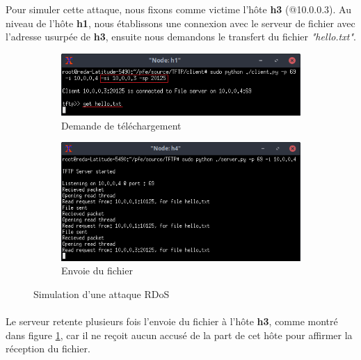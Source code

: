 \noindent Pour simuler cette attaque, nous fixons comme victime l'hôte \textbf{h3} (@10.0.0.3). Au niveau de l'hôte \textbf{h1}, nous établissons une connexion avec le serveur de fichier avec l'adresse usurpée de \textbf{h3}, ensuite nous demandons le transfert du fichier \textit{"hello.txt"}.\\
\begin{figure}[h]
\centering
\begin{subfigure}{13cm}
\centering
\includegraphics[width=\textwidth]{Figures/simulation/mininet/TFTP/client/attack}
\caption{Demande de téléchargement}
\end{subfigure}
\vskip 0.4cm
\begin{subfigure}{13cm}
\centering
\includegraphics[width=\textwidth]{Figures/simulation/mininet/TFTP/server/attack_request}
\caption{Envoie du fichier}
\label{fig:send}
\end{subfigure}
\vskip 0.3cm
\decoRule
\caption{Simulation d'une attaque RDoS}
\label{fig:rdos_simulation}
\end{figure}
\paragraph{}
Le serveur retente plusieurs fois l'envoie du fichier à l'hôte \textbf{h3}, comme montré dans figure \ref{fig:send}, car il ne reçoit aucun accusé de la part de cet hôte pour affirmer la réception du fichier.\\

